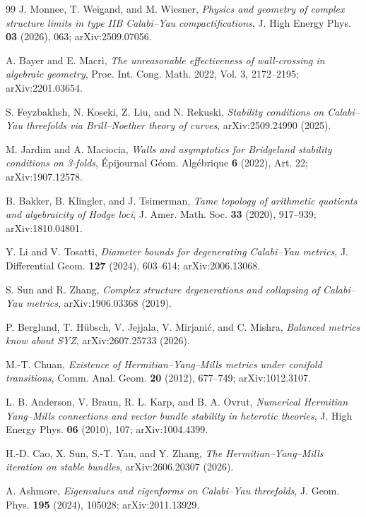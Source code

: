 \documentclass[11pt]{article}
\theoremstyle{definition}
\begin{document}
\begin{thebibliography}{99}
 J. Monnee, T. Weigand, and M. Wiesner, \emph{Physics and geometry of complex structure limits in type IIB Calabi--Yau compactifications}, J. High Energy Phys. \textbf{03} (2026), 063; arXiv:2509.07056.

 A. Bayer and E. Macr\`i, \emph{The unreasonable effectiveness of wall-crossing in algebraic geometry}, Proc. Int. Cong. Math. 2022, Vol. 3, 2172--2195; arXiv:2201.03654.

 S. Feyzbakhsh, N. Koseki, Z. Liu, and N. Rekuski, \emph{Stability conditions on Calabi--Yau threefolds via Brill--Noether theory of curves}, arXiv:2509.24990 (2025).

 M. Jardim and A. Maciocia, \emph{Walls and asymptotics for Bridgeland stability conditions on 3-folds}, \'Epijournal G\'eom. Alg\'ebrique \textbf{6} (2022), Art. 22; arXiv:1907.12578.

 B. Bakker, B. Klingler, and J. Tsimerman, \emph{Tame topology of arithmetic quotients and algebraicity of Hodge loci}, J. Amer. Math. Soc. \textbf{33} (2020), 917--939; arXiv:1810.04801.

 Y. Li and V. Tosatti, \emph{Diameter bounds for degenerating Calabi--Yau metrics}, J. Differential Geom. \textbf{127} (2024), 603--614; arXiv:2006.13068.

 S. Sun and R. Zhang, \emph{Complex structure degenerations and collapsing of Calabi--Yau metrics}, arXiv:1906.03368 (2019).

 P. Berglund, T. H\"ubsch, V. Jejjala, V. Mirjani\'c, and C. Mishra, \emph{Balanced metrics know about SYZ}, arXiv:2607.25733 (2026).

 M.-T. Chuan, \emph{Existence of Hermitian--Yang--Mills metrics under conifold transitions}, Comm. Anal. Geom. \textbf{20} (2012), 677--749; arXiv:1012.3107.

 L. B. Anderson, V. Braun, R. L. Karp, and B. A. Ovrut, \emph{Numerical Hermitian Yang--Mills connections and vector bundle stability in heterotic theories}, J. High Energy Phys. \textbf{06} (2010), 107; arXiv:1004.4399.

 H.-D. Cao, X. Sun, S.-T. Yau, and Y. Zhang, \emph{The Hermitian--Yang--Mills iteration on stable bundles}, arXiv:2606.20307 (2026).

 A. Ashmore, \emph{Eigenvalues and eigenforms on Calabi--Yau threefolds}, J. Geom. Phys. \textbf{195} (2024), 105028; arXiv:2011.13929.


\end{thebibliography}
\end{document}
